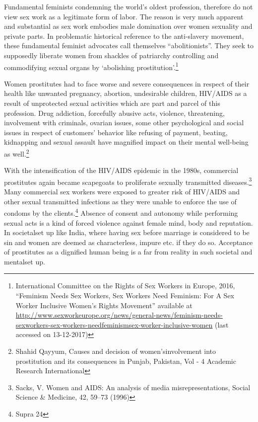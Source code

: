 \begin{multicols}{2}
\noi
Fundamental feminists condemning the world’s oldest profession, therefore do not view sex
work as a legitimate form of labor. The reason is very much apparent and substantial as sex
work embodies male domination over women sexuality and private parts. In problematic
historical reference to the anti-slavery movement, these fundamental feminist advocates call
themselves “abolitionists”. They seek to supposedly liberate women from shackles of
patriarchy controlling and commodifying sexual organs by ‘abolishing prostitution’.\footnote{International Committee on the Rights of Sex Workers in Europe, 2016, “Feminism Needs Sex Workers, Sex Workers Need Feminism: For A Sex Worker Inclusive Women’s Rights Movement” available at \url{http://www.sexworkeurope.org/news/general-news/feminism-needs-sexworkers-sex-workers-needfeminismsex-worker-inclusive-women} (last accessed on 13-12-2017)}

\noi
Women prostitutes had to face worse and severe consequences in respect of their health like
unwanted pregnancy, abortion, undesirable children, HIV/AIDS as a result of unprotected
sexual activities which are part and parcel of this profession. Drug addiction, forcefully abusive
acts, violence, threatening, involvement with criminals, ovarian issues, some other
psychological and social issues in respect of customers' behavior like refusing of payment,
beating, kidnapping and sexual assault have magnified impact on their mental well-being as
well.\footnote{Shahid Qayyum, Causes and decision of women'sinvolvement into prostitution and its consequences in Punjab, Pakistan, Vol - 4 Academic Research International}

\noi
With the intensification of the HIV/AIDS epidemic in the 1980s, commercial prostitutes again
became scapegoats to proliferate sexually transmitted diseases.\footnote{Sacks, V. Women and AIDS: An analysis of media misrepresentations, Social Science \& Medicine, 42, 59–73 (1996)} Many commercial sex
workers were exposed to greater risk of HIV/AIDS and other sexual transmitted infections as
they were unable to enforce the use of condoms by the clients.\footnote{Supra 24} Absence of consent and
autonomy while performing sexual acts is a kind of forced violence against female mind, body
and reputation. In societalset up like India, where having sex before marriage is considered to
be sin and women are deemed as characterless, impure etc. if they do so. Acceptance of
prostitutes as a dignified human being is a far from reality in such societal and mentalset up.


\end{multicols}
